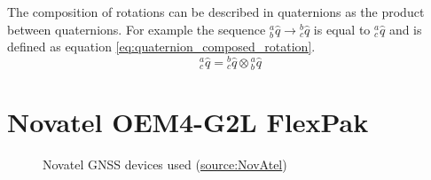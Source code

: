 \begin{description}[]
	\item [Composed rotations] The composition of rotations can be described in quaternions as the product between quaternions. For example the sequence ${}^a_b\hat{q} \rightarrow {}^b_c\hat{q}$ is equal to ${}^a_c\hat{q}$ and is defined as equation \ref{eq:quaternion_composed_rotation}.
	\begin{equation}
	{}^a_c\hat{q} = {}^b_c\hat{q} \otimes {}^a_b\hat{q}
	\label{eq:quaternion_composed_rotation}
	\end{equation}
\end{description}

\section{Novatel OEM4-G2L FlexPak} \label{section:novatel} 

\begin{figure}[!hb]
	\centering
	\caption[Novatel GNSS devices used]{Novatel GNSS devices used (\href{https://www.novatel.com}{source:NovAtel})}
	\label{fig:novatel_devices}
\end{figure}

